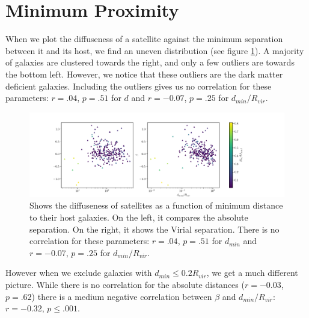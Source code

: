 \section{Minimum Proximity}

When we plot the diffuseness of a satellite against the minimum separation between it and its host, we find an uneven distribution (see figure \ref{fig:beta-dmin}). A majority of galaxies are clustered towards the right, and only a few outliers are towards the bottom left. However, we notice that these outliers are the dark matter deficient galaxies. Including the outliers gives us no correlation for these parameters: $r = .04$, $p=.51$ for $d$ and $r = -0.07$, $p = .25$ for $d_{min} / R_{vir}$.
\begin{figure}
    \centering
    \includegraphics*[width=\textwidth*11/10]{figs/me/beta-dmin.pdf}
    \caption{Shows the diffuseness of satellites as a function of minimum distance to their host galaxies. On the left, it compares the absolute separation. On the right, it shows the Virial separation. There is no correlation for these parameters: $r = .04$, $p=.51$ for $d_{min}$ and $r = -0.07$, $p = .25$ for $d_{min} / R_{vir}$.}
    \label{fig:beta-dmin}
\end{figure}

However when we exclude galaxies with $d_{min} \leq 0.2 R_{vir}$, we get a much different picture. While there is no correlation for the absolute distances ($r = -0.03$, $p = .62$) there is a medium negative correlation between $\beta$ and $d_{min}/R_{vir}$: $r=-0.32$, $p \leq .001$.

